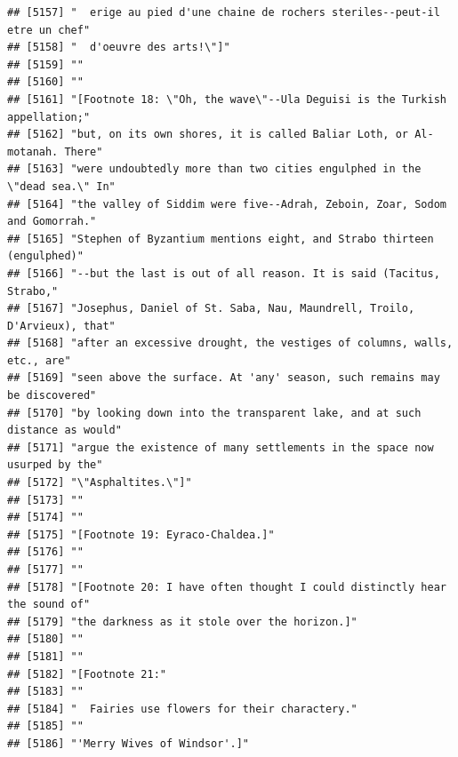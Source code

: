 \documentclass{article}\usepackage[]{graphicx}\usepackage[]{color}
\makeatletter
\newenvironment{kframe}{%
 \def\at@end@of@kframe{}%
 \ifinner\ifhmode%
  \def\at@end@of@kframe{\end{minipage}}%
  \begin{minipage}{\columnwidth}%
 \fi\fi%
 \def\FrameCommand##1{\hskip\@totalleftmargin \hskip-\fboxsep
 \colorbox{shadecolor}{##1}\hskip-\fboxsep
     \hskip-\linewidth \hskip-\@totalleftmargin \hskip\columnwidth}%
 \MakeFramed {\advance\hsize-\width
   \@totalleftmargin\z@ \linewidth\hsize
   \@setminipage}}%
 {\par\unskip\endMakeFramed%
 \at@end@of@kframe}
\newenvironment{knitrout}{}{} %
\makeatother
\begin{document}
\begin{knitrout}
\begin{kframe}
\begin{verbatim}
## [5157] "  erige au pied d'une chaine de rochers steriles--peut-il etre un chef"      
## [5158] "  d'oeuvre des arts!\"]"                                                     
## [5159] ""                                                                            
## [5160] ""                                                                            
## [5161] "[Footnote 18: \"Oh, the wave\"--Ula Deguisi is the Turkish appellation;"     
## [5162] "but, on its own shores, it is called Baliar Loth, or Al-motanah. There"      
## [5163] "were undoubtedly more than two cities engulphed in the \"dead sea.\" In"     
## [5164] "the valley of Siddim were five--Adrah, Zeboin, Zoar, Sodom and Gomorrah."    
## [5165] "Stephen of Byzantium mentions eight, and Strabo thirteen (engulphed)"        
## [5166] "--but the last is out of all reason. It is said (Tacitus, Strabo,"           
## [5167] "Josephus, Daniel of St. Saba, Nau, Maundrell, Troilo, D'Arvieux), that"      
## [5168] "after an excessive drought, the vestiges of columns, walls, etc., are"       
## [5169] "seen above the surface. At 'any' season, such remains may be discovered"     
## [5170] "by looking down into the transparent lake, and at such distance as would"    
## [5171] "argue the existence of many settlements in the space now usurped by the"     
## [5172] "\"Asphaltites.\"]"                                                           
## [5173] ""                                                                            
## [5174] ""                                                                            
## [5175] "[Footnote 19: Eyraco-Chaldea.]"                                              
## [5176] ""                                                                            
## [5177] ""                                                                            
## [5178] "[Footnote 20: I have often thought I could distinctly hear the sound of"     
## [5179] "the darkness as it stole over the horizon.]"                                 
## [5180] ""                                                                            
## [5181] ""                                                                            
## [5182] "[Footnote 21:"                                                               
## [5183] ""                                                                            
## [5184] "  Fairies use flowers for their charactery."                                 
## [5185] ""                                                                            
## [5186] "'Merry Wives of Windsor'.]"                                                  

\end{verbatim}
\end{kframe}
\end{knitrout}
\end{document}
